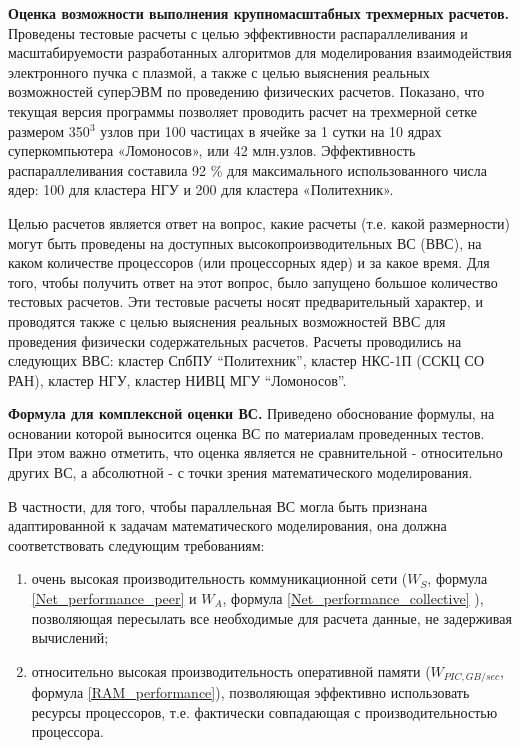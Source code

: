 \textbf{Оценка возможности выполнения крупномасштабных трехмерных расчетов.}
Проведены тестовые расчеты с целью эффективности распараллеливания и масштабируемости разработанных алгоритмов для моделирования взаимодействия электронного пучка с плазмой, а также с целью выяснения реальных возможностей суперЭВМ по проведению физических расчетов. Показано, что текущая версия программы позволяет проводить расчет на трехмерной сетке размером 350$^3$ узлов при 100 частицах в ячейке за 1 сутки на 10 ядрах суперкомпьютера «Ломоносов», или 42 млн.узлов. Эффективность распараллеливания составила 92 \% для максимального использованного числа ядер: 100 для кластера НГУ и 200 для кластера «Политехник».  

Целью расчетов  является ответ на вопрос, какие расчеты (т.е. какой размерности) могут быть проведены на доступных высокопроизводительных  ВС (ВВС), на каком количестве процессоров (или процессорных ядер) и за какое время. 
Для того, чтобы получить ответ на этот вопрос, было запущено большое количество тестовых расчетов. Эти тестовые расчеты носят предварительный характер, и проводятся также с целью выяснения реальных возможностей ВВС для проведения физически содержательных расчетов. 	Расчеты проводились на следующих ВВС: кластер СпбПУ “Политехник”, кластер НКС-1П (ССКЦ СО РАН), кластер НГУ,  кластер НИВЦ МГУ “Ломоносов”. 

\textbf{Формула для комплексной оценки ВС.}
Приведено обоснование формулы, на основании которой выносится оценка ВС по материалам проведенных тестов. При этом важно отметить, что оценка является не сравнительной - относительно других ВС, а абсолютной - с точки зрения математического моделирования. 

В частности, для того, чтобы параллельная ВС могла быть признана адаптированной к задачам математического моделирования, она должна соответствовать следующим требованиям:
\begin{enumerate}
	\item очень высокая производительность коммуникационной сети ($W_S$, формула \ref{Net_performance_peer} и $W_A$, формула \ref{Net_performance_collective} ), позволяющая пересылать все необходимые для расчета данные, не задерживая вычислений;
	
	\item относительно высокая производительность оперативной памяти ($W_{PIC,GB/sec}$, формула \ref{RAM_performance}), позволяющая эффективно использовать ресурсы процессоров, т.е. фактически совпадающая с производительностью процессора.  	
\end{enumerate}

